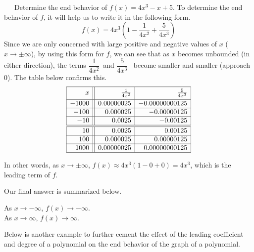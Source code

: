 \medskip
\begin{example}~~~Determine the end behavior of $f(x) = 4x^3 - x + 5$.\pp
To determine the end behavior of $f$, it will help us to write it in the following form.
$$f(x) = 4x^3 \left( 1 - \dfrac{1}{4x^2} + \dfrac{5}{4x^3}\right)$$
Since we are only concerned with large positive and negative values of $x$ ($x \rightarrow \pm \infty$), by using this form for $f$, we can see that as $x$ becomes unbounded (in either direction), the terms $\dfrac{1}{4x^2}$~and $\dfrac{5}{4x^3}$~ become smaller and smaller (approach $0$).  The table below confirms this.
\[ \begin{array}{|r||r|r|}  

\hline 

 x & \frac{1}{4x^2} & \frac{5}{4x^3} \vphantom{\dfrac{a}{a}} \\ [2pt] \hline
-1000  & 0.00000025 & -0.00000000125 \\  \hline
-100  & 0.000025 & -0.00000125 \\  \hline
-10 & 0.0025 & -0.00125 \\  \hline\hline
10  & 0.0025 & 0.00125 \\  \hline
100 & 0.000025 & 0.00000125 \\  \hline
1000 & 0.00000025 & 0.00000000125 \\  \hline
\end{array} \]

\smallskip

In other words, as $x \rightarrow \pm \infty$, $f(x) \approx 4x^3\left( 1 - 0 +0\right) = 4x^3$, which is the leading term of $f$.\pp

Our final answer is summarized below.
\begin{center}
As $x \rightarrow -\infty$, $f(x) \rightarrow -\infty$.\\
As $x \rightarrow \infty$, $f(x) \rightarrow \infty$.
\end{center}
\end{example}

Below is another example to further cement the effect of the leading coefficient and degree of a polynomial on the end behavior of the graph of a polynomial.

